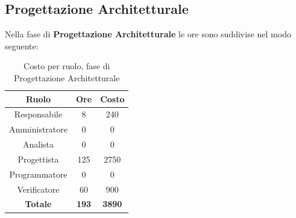 \subsection{Progettazione Architetturale}
Nella fase di \textbf{Progettazione Architetturale} le ore sono suddivise nel modo seguente:
\begin{table}[H]
	\centering
	\begin{tabular}{|c|c|c|}
		\hline
		\textbf{Ruolo} &
		\textbf{Ore} &
		\textbf{Costo} \\
		\hline
		Responsabile & 8 & 240\\
		\hline
		Amministratore & 0 & 0\\
		\hline
		Analista & 0 & 0\\
		\hline
		Progettista & 125 & 2750 \\
		\hline
		Programmatore & 0 & 0 \\
		\hline
		Verificatore & 60 & 900\\
		\hline
		\textbf{Totale} & \textbf{193} & \textbf{3890} \\
		\hline
	\end{tabular}
	\caption{Costo per ruolo, fase di Progettazione Architetturale}
\end{table}

